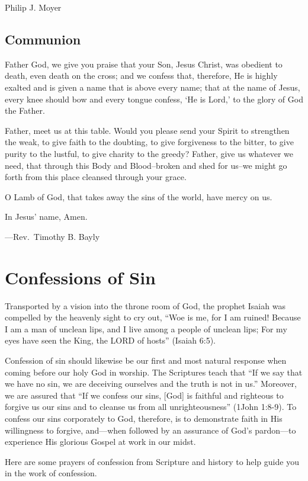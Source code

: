\documentclass[]{book}
\begin{document}
Philip J. Moyer

\section{Communion}\label{communion}

Father God, we give you praise that your Son, Jesus Christ, was obedient
to death, even death on the cross; and we confess that, therefore, He is
highly exalted and is given a name that is above every name; that at the
name of Jesus, every knee should bow and every tongue confess, `He is
Lord,' to the glory of God the Father.

Father, meet us at this table. Would you please send your Spirit to
strengthen the weak, to give faith to the doubting, to give forgiveness
to the bitter, to give purity to the lustful, to give charity to the
greedy? Father, give us whatever we need, that through this Body and
Blood--broken and shed for us--we might go forth from this place
cleansed through your grace.

O Lamb of God, that takes away the sins of the world, have mercy on us.

In Jesus' name, Amen.

---Rev.~Timothy B. Bayly

\chapter{Confessions of Sin}\label{confessions-of-sin}

Transported by a vision into the throne room of God, the prophet Isaiah
was compelled by the heavenly sight to cry out, ``Woe is me, for I am
ruined! Because I am a man of unclean lips, and I live among a people of
unclean lips; For my eyes have seen the King, the LORD of hosts''
(Isaiah 6:5).

Confession of sin should likewise be our first and most natural response
when coming before our holy God in worship. The Scriptures teach that
``If we say that we have no sin, we are deceiving ourselves and the
truth is not in us.'' Moreover, we are assured that ``If we confess our
sins, {[}God{]} is faithful and righteous to forgive us our sins and to
cleanse us from all unrighteousness'' (1John 1:8-9). To confess our sins
corporately to God, therefore, is to demonstrate faith in His
willingness to forgive, and---when followed by an assurance of God's
pardon---to experience His glorious Gospel at work in our midst.

Here are some prayers of confession from Scripture and history to help
guide you in the work of confession.
\end{document}
